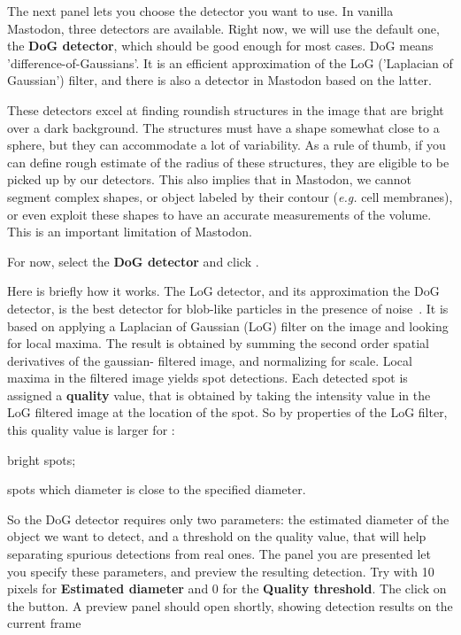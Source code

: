 The next panel lets you choose the detector you want to use.
In vanilla Mastodon, three detectors are available.
Right now, we will use the default one, the \textbf{DoG detector}, which should be good enough for most cases.
DoG means 'difference-of-Gaussians'.
It is an efficient approximation of the LoG ('Laplacian of Gaussian') filter, and there is also a detector in Mastodon based on the latter.

These detectors excel at finding roundish structures in the image that are bright over a dark background.
The structures must have a shape somewhat close to a sphere, but they can accommodate a lot of variability.
As a rule of thumb, if you can define rough estimate of the radius of these structures, they are eligible to be picked up by our detectors. 
This also implies that in Mastodon, we cannot segment complex shapes, or object labeled by their contour (\textit{e.g.} cell membranes), or even exploit these shapes to have an accurate measurements of the volume. 
This is an important limitation of Mastodon.

For now, select the \textbf{DoG detector} and click .

Here is briefly  how it works.
The LoG detector, and its approximation the DoG detector, is the best detector for blob-like particles in the presence of noise~\cite{Sage2005}. 
It is based on applying a Laplacian of Gaussian (LoG) filter on the image and looking for local maxima. The result is obtained by summing the second order spatial derivatives of the gaussian- filtered image, and normalizing for scale.
Local maxima in the filtered image yields spot detections. 
Each detected spot is assigned a \textbf{quality} value, that is obtained by taking the intensity value in the LoG filtered image at the location of the spot.
So by properties of the LoG filter, this quality value is larger for :
\begin{myitemize}
    \item bright spots;
    \item spots which diameter is close to the specified diameter.
\end{myitemize}

So the DoG detector requires only two parameters: the estimated diameter of the object we want to detect, and a threshold on the quality value, that will help separating spurious detections from real ones. 
The panel you are presented let you specify these parameters, and preview the resulting detection.
Try with 10 pixels for \textbf{Estimated diameter} and 0 for the \textbf{Quality threshold}.
The click on the  button.
A preview panel should open shortly, showing detection results on the current frame

